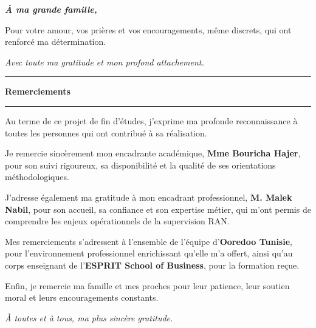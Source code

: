\documentclass[12pt,a4paper]{report}
\begin{document}
\begin{center}\textbf{\textit{À ma grande famille,}}\end{center}
Pour votre amour, vos prières et vos encouragements, même discrets, qui ont renforcé ma détermination.

\begin{flushright}\textit{Avec toute ma gratitude et mon profond attachement.}\end{flushright}
\clearpage

\thispagestyle{plain}
\vspace*{1.2cm}
\noindent\hspace*{1.25cm}\begin{minipage}[c]{0.06\textwidth}\color{black}\rule{0.42cm}{1.25cm}\end{minipage}\hspace{-0.15cm}%
\begin{minipage}[c]{0.75\textwidth}{\LARGE\bfseries Remerciements}\\[-0.15cm]\rule{0.78\textwidth}{0.5pt}\end{minipage}
\vspace{1.35cm}
Au terme de ce projet de fin d'études, j'exprime ma profonde reconnaissance à toutes les personnes qui ont contribué à sa réalisation.

Je remercie sincèrement mon encadrante académique, \textbf{Mme Bouricha Hajer}, pour son suivi rigoureux, sa disponibilité et la qualité de ses orientations méthodologiques.

J'adresse également ma gratitude à mon encadrant professionnel, \textbf{M. Malek Nabil}, pour son accueil, sa confiance et son expertise métier, qui m'ont permis de comprendre les enjeux opérationnels de la supervision RAN.

Mes remerciements s'adressent à l'ensemble de l'équipe d'\textbf{Ooredoo Tunisie}, pour l'environnement professionnel enrichissant qu'elle m'a offert, ainsi qu'au corps enseignant de l'\textbf{ESPRIT School of Business}, pour la formation reçue.

Enfin, je remercie ma famille et mes proches pour leur patience, leur soutien moral et leurs encouragements constants.

\begin{flushright}\textit{À toutes et à tous, ma plus sincère gratitude.}\end{flushright}
\clearpage
\end{document}

